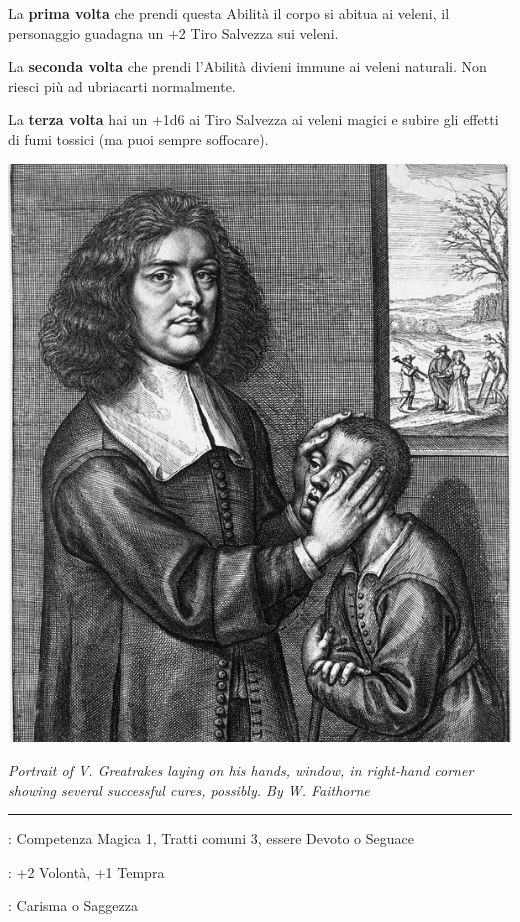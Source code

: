 \begin{multicols}{2}

La \textbf{prima volta} che prendi questa Abilità il corpo si abitua ai veleni, il personaggio guadagna un +2 Tiro Salvezza sui veleni.

La \textbf{seconda volta} che prendi l'Abilità divieni immune ai veleni naturali. Non riesci più ad ubriacarti normalmente.

La \textbf{terza volta} hai un +1d6 ai Tiro Salvezza ai veleni magici e subire gli effetti di fumi tossici (ma puoi sempre soffocare).


\medskip

\begin{center}
	\includegraphics[width=0.75\linewidth]{immagini/Portrait_of_V_Greatrakesv2.png}

	\emph{Portrait of V. Greatrakes laying on his hands, window, in right-hand corner showing several successful cures, possibly. By W. Faithorne }
\end{center}

\smallskip\noindent\rule{\linewidth}{2pt} \hypertarget{Imposizione delle mani}{}\medskip{}
\noindent
\begin{description}[noitemsep, topsep=0pt, parsep=0pt, partopsep=0pt, leftmargin=0cm, labelwidth=2.5cm]
    \item[\textbf{Requisito}]: Competenza Magica 1, Tratti comuni 3, essere Devoto o Seguace
    \item[\textbf{Tiri Salvezza}]: +2 Volontà, +1 Tempra
    \item[\textbf{Caratteristica}]: Carisma o Saggezza
\end{description}


\end{multicols}
